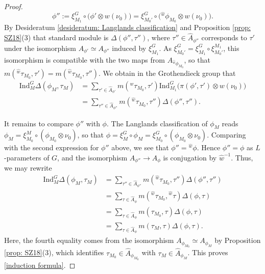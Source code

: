 \documentclass[11pt,letterpaper]{amsart}
\newcommand{\irrepdual}[1]{\widehat{#1}}
\newcommand{\Ind}{\mathrm{Ind}}
\renewcommand{\1}{\mathbbm{1}}
\numberwithin{equation}{section}
\begin{document}
{\begin{proof}
\[\phi'':= \xi_{M_1}^G \circ \big(\phi' \otimes w(\nu_0)\big) = \xi_{M_0'}^G \circ \big({}^{\widehat{w}} \phi_{M_0}\otimes w(\nu_0)\big).\]
By Desideratum \ref{desideratum: Langlands classification} and Proposition \ref{prop: SZ18}(3) that standard module is $\Delta(\phi'',\tau'')$, where $\tau''\in\irrepdual{A}_{\phi''}$ corresponds to $\tau'$ under the isomorphism $A_{\phi'}\simeq A_{\phi''}$ induced by $\xi_{M_1}^G$. As $\xi_{M_0'}^G=\xi_{M_1}^G\circ \xi_{M_0'}^{M_1}$, this isomorphism is compatible with the two maps from $A_{{}^{\widehat{w}}\phi_{M_0}}$, so that $m({}^{\widehat{w}}\tau_{M_0},\tau')=m({}^{\widehat{w}}\tau_{M_0},\tau'')$. We obtain in the Grothendieck group that
\begin{align*}
    \Ind_M^G \Delta(\phi_M, \tau_M)&= \sum_{\tau' \in \widehat{A}_{\phi'} }   m( {}^{\widehat{w}}\tau_{M_0},\tau')  \Ind_{{M_1}}^G \big( \pi(\phi', \tau') \otimes w(\nu_0)\big)\\
    &=\sum_{\tau'' \in \widehat{A}_{\phi''} }   m( {}^{\widehat{w}}\tau_{M_0},\tau'')  \Delta(\phi'', \tau'').
\end{align*}

It remains to compare $\phi''$ with $\phi$. The Langlands classification of $\phi_M$ reads $\phi_M=\xi_{M_0}^M\circ(\phi_{M_0}\otimes\nu_0)$, so that $\phi=\xi_M^G\circ \phi_M=\xi_{M_0}^G\circ(\phi_{M_0}\otimes\nu_0)$. Comparing with the second expression for $\phi''$ above, we see that $\phi''={}^{\widehat{w}}\phi$. Hence $\phi''=\phi$ as $L$-parameters of $G$, and the isomorphism $A_{\phi''}\to A_\phi$ is conjugation by $\widehat{w}^{-1}$. Thus, we may rewrite
\begin{align*}
      \Ind_M^G \Delta(\phi_M, \tau_M)
    &=\sum_{\tau'' \in \widehat{A}_{\phi''} }   m( {}^{\widehat{w}}\tau_{M_0},\tau'')  \Delta(\phi'', \tau'')\\
    &=\sum_{\tau \in \widehat{A}_{\phi} }   m( {}^{\widehat{w}}\tau_{M_0},{}^{\widehat{w}}\tau)  \Delta(\phi, \tau)\\
    &=\sum_{\tau \in \widehat{A}_{\phi} }   m( \tau_{M_0},\tau)  \Delta(\phi, \tau)\\
    &=\sum_{\tau \in \widehat{A}_{\phi} }   m( \tau_{M},\tau)  \Delta(\phi, \tau).
\end{align*}
Here, the fourth equality comes from the isomorphism $A_{\phi_{M_0}}\simeq A_{\phi_M}$ by Proposition \ref{prop: SZ18}(3), which identifies $\tau_{M_0} \in \widehat{A}_{\phi_{M_0}}$ with $\tau_M \in \widehat{A}_{\phi_M}$. This proves \eqref{induction formula}.


\end{proof}}
\end{document}
